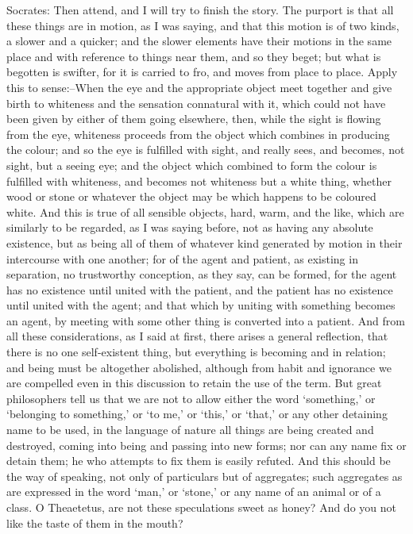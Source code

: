 Socrates: Then attend, and I will try to finish the story. The purport
is that all these things are in motion, as I was saying, and that this
motion is of two kinds, a slower and a quicker; and the slower elements
have their motions in the same place and with reference to things near
them, and so they beget; but what is begotten is swifter, for it
is carried to fro, and moves from place to place. Apply this to
sense:--When the eye and the appropriate object meet together and give
birth to whiteness and the sensation connatural with it, which could not
have been given by either of them going elsewhere, then, while the
sight is flowing from the eye, whiteness proceeds from the object which
combines in producing the colour; and so the eye is fulfilled with
sight, and really sees, and becomes, not sight, but a seeing eye;
and the object which combined to form the colour is fulfilled with
whiteness, and becomes not whiteness but a white thing, whether wood or
stone or whatever the object may be which happens to be coloured white.
And this is true of all sensible objects, hard, warm, and the like,
which are similarly to be regarded, as I was saying before, not as
having any absolute existence, but as being all of them of whatever kind
generated by motion in their intercourse with one another; for of the
agent and patient, as existing in separation, no trustworthy conception,
as they say, can be formed, for the agent has no existence until united
with the patient, and the patient has no existence until united with
the agent; and that which by uniting with something becomes an agent, by
meeting with some other thing is converted into a patient. And from
all these considerations, as I said at first, there arises a general
reflection, that there is no one self-existent thing, but everything
is becoming and in relation; and being must be altogether abolished,
although from habit and ignorance we are compelled even in this
discussion to retain the use of the term. But great philosophers tell us
that we are not to allow either the word `something,' or `belonging to
something,' or `to me,' or `this,' or `that,' or any other detaining
name to be used, in the language of nature all things are being created
and destroyed, coming into being and passing into new forms; nor can any
name fix or detain them; he who attempts to fix them is easily refuted.
And this should be the way of speaking, not only of particulars but
of aggregates; such aggregates as are expressed in the word `man,' or
`stone,' or any name of an animal or of a class. O Theaetetus, are not
these speculations sweet as honey? And do you not like the taste of them
in the mouth?

